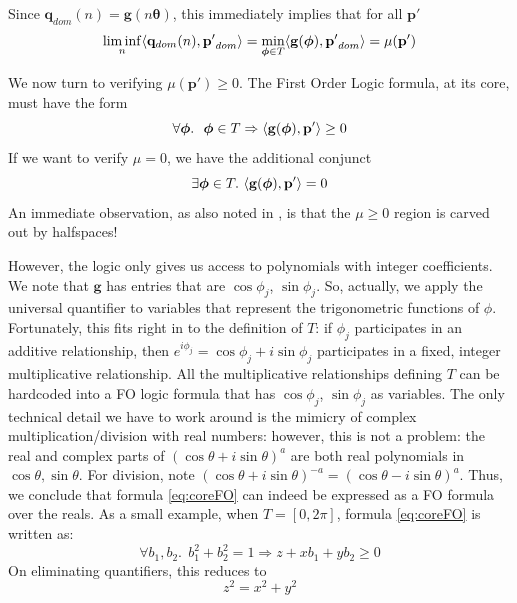 Since $\mathbf{q}_{dom}(n) = \mathbf{g}(n\boldsymbol{\theta})$, this immediately implies that for all $\mathbf{p'}$
\begin{equation}
\liminf_n  \langle\mathbf{q}_{dom}(n), \mathbf{p'}_{dom}\rangle = \min_{\boldsymbol{\phi} \in T} \langle\mathbf{g}(\boldsymbol{\phi}), \mathbf{p'}_{dom}\rangle  = \mu(\mathbf{p'})
\end{equation}

We now turn to verifying $\mu(\mathbf{p'}) \ge 0$. The First Order Logic formula, at its core, must have the form
\begin{equation}
\label{eq:coreFO}
\forall \boldsymbol\phi.~~\boldsymbol{\phi} \in T \Rightarrow \langle\mathbf{g}(\boldsymbol\phi), \mathbf{p'}\rangle \ge 0
\end{equation}
If we want to verify $\mu = 0$, we have the additional conjunct
\begin{equation}
\label{eq:coreFOzero}
\exists \boldsymbol{\phi} \in T.~\langle\mathbf{g}(\boldsymbol\phi), \mathbf{p'}\rangle = 0
\end{equation}
An immediate observation, as also noted in \cite{originalstacs,originalarxiv}, is that the $\mu \ge 0$ region is carved out by halfspaces!

However, the logic only gives us access to polynomials with integer coefficients. We note that $\mathbf{g}$ has entries that are $\cos \phi_j$, $\sin \phi_j$. So, actually, we apply the universal quantifier to variables that represent the trigonometric functions of $\phi$. Fortunately, this fits right in to the definition of $T$: if $\phi_j$ participates in an additive relationship, then $e^{i\phi_j} = \cos \phi_j + i\sin \phi_j$ participates in a fixed, integer multiplicative relationship. All the multiplicative relationships defining $T$ can be hardcoded into a FO logic formula that has $\cos \phi_j$, $\sin \phi_j$ as variables. The only technical detail we have to work around is the mimicry of complex multiplication/division with real numbers: however, this is not a problem: the real and complex parts of $(\cos\theta + i\sin \theta)^a$ are both real polynomials in $\cos \theta, \sin\theta$. For division, note $(\cos \theta + i\sin \theta)^{-a} = (\cos \theta - i\sin\theta)^a$. Thus, we conclude that formula \ref{eq:coreFO} can indeed be expressed as a FO formula over the reals. As a small example, when $T = [0, 2\pi]$, formula \ref{eq:coreFO} is written as:
\begin{equation}
\forall b_1, b_2. ~~b_1^2 + b_2^2 = 1 \Rightarrow z + xb_1 + yb_2 \ge 0
\end{equation}
On eliminating quantifiers, this reduces to
\begin{equation}
\label{eq:cone}
z^2 = x^2 + y^2
\end{equation}

